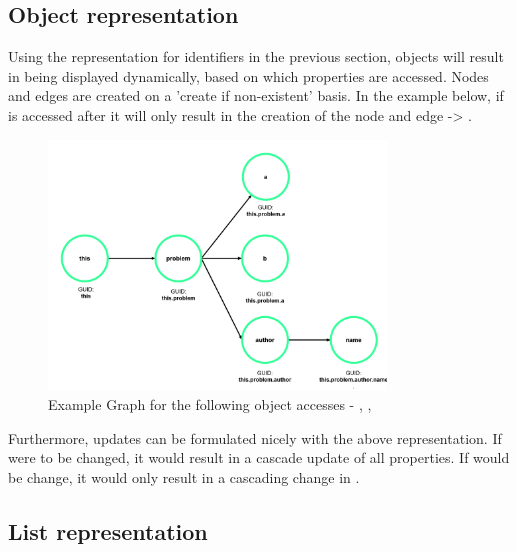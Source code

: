 \subsection{Object representation}

Using the representation for identifiers in the previous section, objects will result in being displayed dynamically, based on which properties are accessed. Nodes and edges are created on a 'create if non-existent' basis. In the example below, if  is accessed after  it will only result in the creation of the node  and edge  -> .

\begin{figure}[H]
    \includegraphics[width=0.8\textwidth]{images/graph_object.png}
     \caption{Example Graph for the following object accesses - , ,   }
     \label{fig:graph_object}
\end{figure}

Furthermore, updates can be formulated nicely with the above representation. If  were to be changed, it would result in a cascade update of all properties. If  would be change, it would only result in a cascading change in . 

\subsection{List representation}
\label{concept:list_creation}


